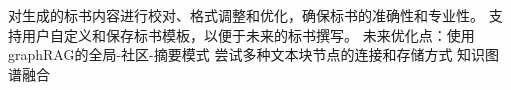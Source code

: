 \documentclass{xmu}
\begin{document}
        对生成的标书内容进行校对、格式调整和优化，确保标书的准确性和专业性。
        支持用户自定义和保存标书模板，以便于未来的标书撰写。
未来优化点：使用graphRAG的全局-社区-摘要模式
尝试多种文本块节点的连接和存储方式
知识图谱融合
\end{document}
